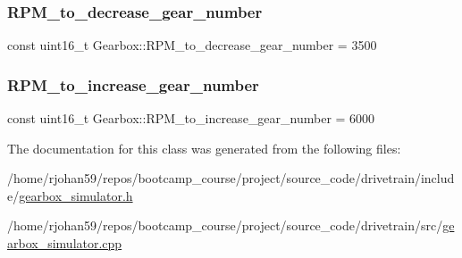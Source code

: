\subsubsection{\texorpdfstring{R\+P\+M\+\_\+to\+\_\+decrease\+\_\+gear\+\_\+number}{RPM\_to\_decrease\_gear\_number}}
{\footnotesize\ttfamily const uint16\+\_\+t Gearbox\+::\+R\+P\+M\+\_\+to\+\_\+decrease\+\_\+gear\+\_\+number = 3500\hspace{0.3cm}{\ttfamily [private]}}

\mbox{\label{classGearbox_a7730abcaf967e6b3709ae41bd1827c14}} 
\subsubsection{\texorpdfstring{R\+P\+M\+\_\+to\+\_\+increase\+\_\+gear\+\_\+number}{RPM\_to\_increase\_gear\_number}}
{\footnotesize\ttfamily const uint16\+\_\+t Gearbox\+::\+R\+P\+M\+\_\+to\+\_\+increase\+\_\+gear\+\_\+number = 6000\hspace{0.3cm}{\ttfamily [private]}}



The documentation for this class was generated from the following files\+:\begin{DoxyCompactItemize}
\item 
/home/rjohan59/repos/bootcamp\+\_\+course/project/source\+\_\+code/drivetrain/include/\hyperlink{gearbox__simulator_8h}{gearbox\+\_\+simulator.\+h}\item 
/home/rjohan59/repos/bootcamp\+\_\+course/project/source\+\_\+code/drivetrain/src/\hyperlink{gearbox__simulator_8cpp}{gearbox\+\_\+simulator.\+cpp}\end{DoxyCompactItemize}
